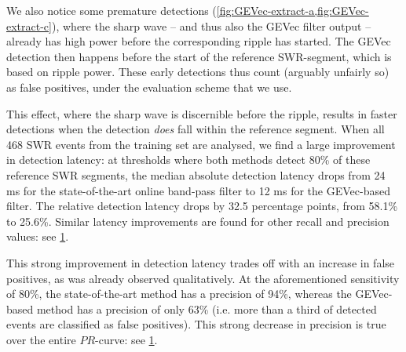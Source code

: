 We also notice some premature detections (\cref{fig:GEVec-extract-a,fig:GEVec-extract-c}), where the sharp wave -- and thus also the GEVec filter output -- already has high power before the corresponding ripple has started. The GEVec detection then happens before the start of the reference SWR-segment, which is based on ripple power. These early detections thus count (arguably unfairly so) as false positives, under the evaluation scheme that we use.

\begin{figure}
\label{fig:LSM-PR-and-latency}
\end{figure}

This effect, where the sharp wave is discernible before the ripple, results in faster detections when the detection \emph{does} fall within the reference segment. When all 468 SWR events from the training set are analysed, we find a large improvement in detection latency: at thresholds where both methods detect 80\% of these reference SWR segments, the median absolute detection latency drops from 24 ms for the state-of-the-art online band-pass filter to 12 ms for the GEVec-based filter. The relative detection latency drops by 32.5 percentage points, from 58.1\% to 25.6\%. Similar latency improvements are found for other recall and precision values: see \cref{fig:LSM-PR-and-latency}.

This strong improvement in detection latency trades off with an increase in false positives, as was already observed qualitatively. At the aforementioned sensitivity of 80\%, the state-of-the-art method has a precision of 94\%, whereas the GEVec-based method has a precision of only 63\% (i.e. more than a third of detected events are classified as false positives). This strong decrease in precision is true over the entire $PR$-curve: see \cref{fig:LSM-PR-and-latency}.
